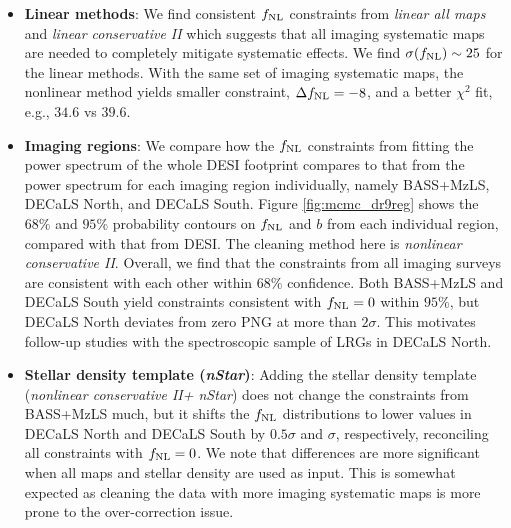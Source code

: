 \begin{itemize}[itemindent=*]

\item \textbf{Linear methods}: We find consistent $f_{\rm NL}$ constraints from \textit{linear all maps} and \textit{linear conservative II} which suggests that  all imaging systematic maps are  needed to completely mitigate systematic effects. We find $\sigma (f_{\rm NL}) \sim 25$ for the linear methods. With the same set of imaging systematic maps, the nonlinear method yields smaller constraint, $\Delta f_{\rm NL} = -8$, and a better $\chi^{2}$ fit, e.g., $34.6$ vs $39.6$.

\item \textbf{Imaging regions}: We compare how the $f_{\rm NL}$ constraints from fitting the power spectrum of the whole DESI footprint compares to that from the power spectrum for each imaging region individually, namely BASS+MzLS, DECaLS North, and DECaLS South. Figure \ref{fig:mcmc_dr9reg} shows the $68\%$ and $95\%$ probability contours on $f_{\rm NL}$ and $b$ from each individual region, compared with that from DESI. The cleaning method here is \textit{nonlinear conservative II}. Overall, we find that the constraints from all imaging surveys are consistent with each other within $68\%$ confidence. Both BASS+MzLS and DECaLS South yield constraints consistent with $f_{\rm NL}=0$ within $95\%$, but DECaLS North deviates from zero PNG at more than $2\sigma$. This motivates follow-up studies with the spectroscopic sample of LRGs in DECaLS North.

\item \textbf{Stellar density template (\textit{nStar})}: Adding the stellar density template (\textit{nonlinear conservative II+ nStar}) does not change the constraints from BASS+MzLS much, but it shifts the $f_{\rm NL}$ distributions to lower values in DECaLS North and DECaLS South by $0.5\sigma$ and $\sigma$, respectively, reconciling all constraints with $f_{\rm NL}=0$. We note that differences are more significant when all maps and stellar density are used as input. This is somewhat expected as cleaning the data with more imaging systematic maps is more prone to the over-correction issue.  


\end{itemize}
